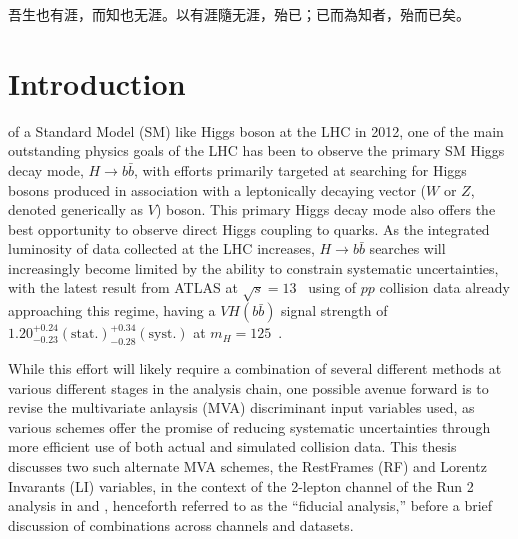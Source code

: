 \begin{savequote}[75mm]
吾生也有涯，而知也无涯。以有涯隨无涯，殆已；已而為知者，殆而已矣。
\end{savequote}

\chapter{Introduction}

 of a Standard Model (SM) like Higgs boson at the LHC in 2012\cite{:2012gk}\cite{:2012gu}, one of the main outstanding physics goals of the LHC has been to observe the primary SM Higgs decay mode, $H\to b\bar{b}$, with efforts primarily targeted at searching for Higgs bosons produced in association with a leptonically decaying vector ($W$ or $Z$, denoted generically as $V$) boson.  This primary Higgs decay mode also offers the best opportunity to observe direct Higgs coupling to quarks.  As the integrated luminosity of data collected at the LHC increases, $H\to b\bar{b}$ searches will increasingly become limited by the ability to constrain systematic uncertainties, with the latest result from ATLAS at $\sqrt{s}=13$ \TeV\, using \LUMI of $pp$ collision data already approaching this regime, having a $VH\left(b\bar{b}\right)$ signal strength of $1.20^{+0.24}_{-0.23}(\textrm{stat.})^{+0.34}_{-0.28}(\textrm{syst.})$ at $m_{H}=125$ \GeV\,\cite{paper}.

While this effort will likely require a combination of several different methods at various different stages in the analysis chain, one possible avenue forward is to revise the multivariate anlaysis (MVA) discriminant input variables used, as various schemes offer the promise of reducing systematic uncertainties through more efficient use of both actual and simulated collision data.  This thesis discusses two such alternate MVA schemes, the RestFrames (RF) and Lorentz Invarants (LI) variables, in the context of the 2-lepton channel of the Run 2 analysis in \cite{paper} and \cite{supportnote}, henceforth referred to as the ``fiducial analysis,'' before a brief discussion of combinations across channels and datasets.



